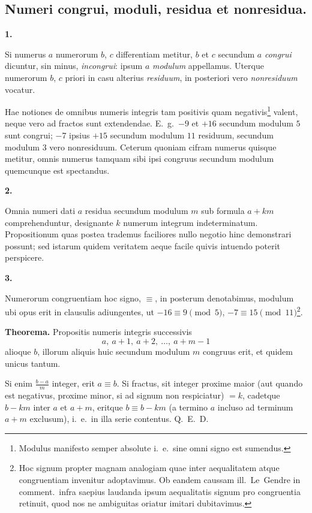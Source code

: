 \documentclass[12pt,a4paper]{article}
\theoremstyle{plain}
\theoremstyle{definition}
\theoremstyle{remark}
\begin{document}
\subsection*{Numeri congrui, moduli, residua et nonresidua.}

\textbf{1.}

Si numerus $a$ numerorum $b$, $c$ differentiam metitur, $b$ et $c$ secundum $a$ \emph{congrui} dicuntur, sin minus, \emph{incongrui}: ipsum $a$ \emph{modulum} appellamus. Uterque numerorum $b$, $c$ priori in casu alterius \emph{residuum}, in posteriori vero \emph{nonresiduum} vocatur.

Hae notiones de omnibus numeris integris tam positivis quam negativis\footnote{Modulus manifesto semper absolute i.~e.\ sine omni signo est sumendus.} valent, neque vero ad fractos sunt extendendae. E.~g.\ $-9$ et $+16$ secundum modulum $5$ sunt congrui; $-7$ ipsius $+15$ secundum modulum $11$ residuum, secundum modulum $3$ vero nonresiduum. Ceterum quoniam cifram numerus quisque metitur, omnis numerus tamquam sibi ipsi congruus secundum modulum quemcunque est spectandus.

\textbf{2.}

Omnia numeri dati $a$ residua secundum modulum $m$ sub formula $a + km$ comprehenduntur, designante $k$ numerum integrum indeterminatum. Propositionum quas postea trademus faciliores nullo negotio hinc demonstrari possunt; sed istarum quidem veritatem aeque facile quivis intuendo poterit perspicere.

\textbf{3.}

Numerorum congruentiam hoc signo, $\equiv$, in posterum denotabimus, modulum ubi opus erit in clausulis adiungentes, ut $-16 \equiv 9 \pmod{5}$, $-7 \equiv 15 \pmod{11}$\footnote{Hoc signum propter magnam analogiam quae inter aequalitatem atque congruentiam invenitur adoptavimus. Ob eandem caussam ill.\ Le~Gendre in comment.\ infra saepius laudanda ipsum aequalitatis signum pro congruentia retinuit, quod nos ne ambiguitas oriatur imitari dubitavimus.}.

\textbf{Theorema.} Propositis numeris integris successivis
\[
a,\ a+1,\ a+2,\ \ldots,\ a+m-1
\]
alioque $b$, illorum aliquis huic secundum modulum $m$ congruus erit, et quidem unicus tantum.

Si enim $\frac{b-a}{m}$ integer, erit $a \equiv b$. Si fractus, sit integer proxime maior (aut quando est negativus, proxime minor, si ad signum non respiciatur) $= k$, cadetque $b - km$ inter $a$ et $a + m$, eritque $b \equiv b - km$ (a termino $a$ incluso ad terminum $a + m$ exclusum), i.~e.\ in illa serie contentus. Q.~E.~D.
\end{document}
